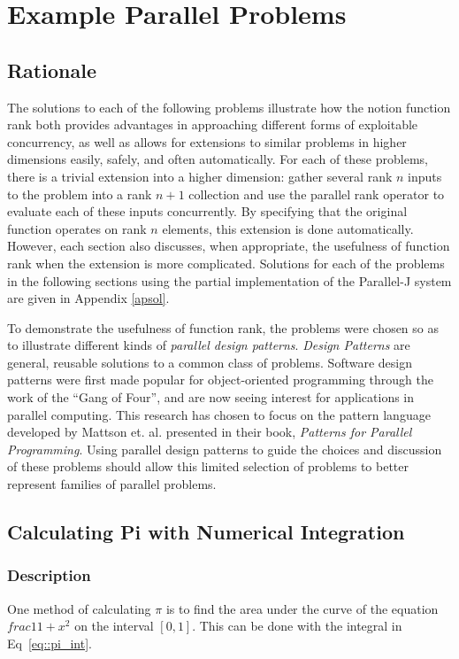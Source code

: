 \chapter{Example Parallel Problems}
\label{probs}

\section{Rationale}
The solutions to each of the following problems illustrate how the notion function rank both
provides advantages in approaching different forms of exploitable concurrency, 
as well as allows for extensions to similar problems in higher dimensions easily, safely, and often automatically.
For each of these problems, there is a trivial extension into a higher dimension: 
gather several rank $n$ inputs to the problem into a rank $n+1$ collection 
and use the parallel rank operator to evaluate each of these inputs concurrently.
By specifying that the original function operates on rank $n$ elements, 
this extension is done automatically. 
However, each section also discusses, when appropriate, 
the usefulness of function rank when the extension is more complicated.
Solutions for each of the problems in the following sections using the partial implementation of the Parallel-J system
are given in Appendix \ref{apsol}.

To demonstrate the usefulness of function rank, 
the problems were chosen so as to illustrate different kinds of \textit{parallel design patterns}. 
\textit{Design Patterns} are general, reusable solutions to a common class of problems. %
Software design patterns were first made popular for object-oriented programming through 
the work of the ``Gang of Four''\cite{designp},
and are now seeing interest for applications in parallel computing\cite{mass}.
This research has chosen to focus on the pattern language developed by Mattson et. al. 
presented in their book, \textit{Patterns for Parallel Programming}\cite{mass}. %
Using parallel design patterns to guide the choices and discussion of these problems 
should allow this limited selection of problems to better represent families of parallel problems.

\section{Calculating Pi with Numerical Integration}
\subsection{Description}
One method of calculating $\pi$ is to find the area under 
the curve of the equation $frac{1}{1+x^2}$ on the interval $[0,1]$.
This can be done with the integral in Eq~\ref{eq::pi_int}.


